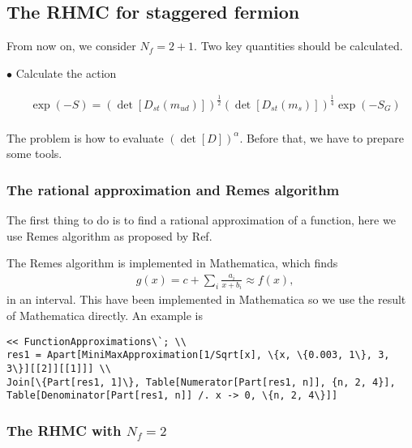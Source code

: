 \subsection{\label{sec:rhmc}The RHMC for staggered fermion}

From now on, we consider $N_f=2+1$. Two key quantities should be calculated.

$\bullet$ Calculate the action

\begin{equation}
\begin{split}
&\exp(-S)=\left(\det [D_{st}(m_{ud})]\right)^{\frac{1}{2}}\left(\det [D_{st}(m_s)]\right)^{\frac{1}{4}} \exp (-S_G)\\
\end{split}
\end{equation}

The problem is how to evaluate $\left(\det [D]\right)^{\alpha}$. Before that, we have to prepare some tools.

\subsubsection{\label{sec:rationalapproximation}The rational approximation and Remes algorithm}

The first thing to do is to find a rational approximation of a function, here we use Remes algorithm as proposed by Ref.

The Remes algorithm is implemented in Mathematica, which finds
\begin{equation}
\begin{split}
&g(x)=c+\sum _i \frac{a_i}{x+b_i}\approx f(x),
\end{split}
\end{equation}
in an interval. This have been implemented in Mathematica so we use the result of Mathematica directly. An example is
\begin{lstlisting}
<< FunctionApproximations\`; \\
res1 = Apart[MiniMaxApproximation[1/Sqrt[x], \{x, \{0.003, 1\}, 3, 3\}][[2]][[1]]] \\
Join[\{Part[res1, 1]\}, Table[Numerator[Part[res1, n]], {n, 2, 4}], Table[Denominator[Part[res1, n]] /. x -> 0, \{n, 2, 4\}]]
\end{lstlisting}

\subsubsection{\label{sec:hmcofrhmc}The RHMC with \texorpdfstring{$N_f=2$}{Nf=2}}


